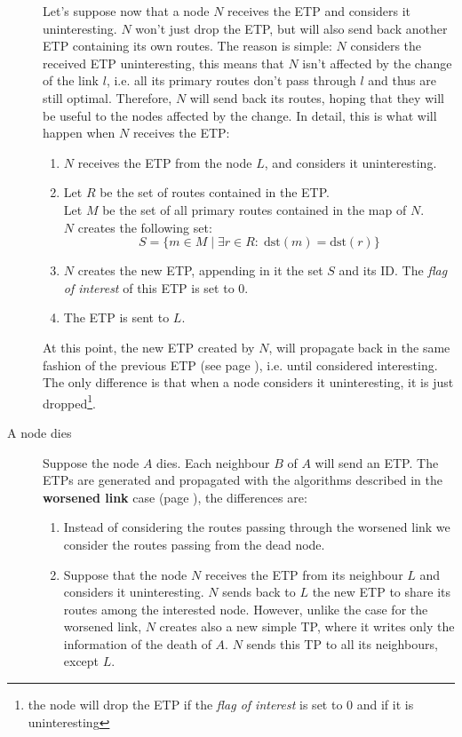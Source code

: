 \documentclass[a4paper]{article}
\newcommand{\T}[1]{\textrm{#1}}
\begin{document}
\begin{description}
	Let's suppose now that a node $N$ receives the ETP and considers it
	uninteresting. $N$ won't just drop the ETP, but will also send back
	another ETP containing its own routes. The reason is simple: $N$
	considers the received ETP uninteresting, this means that $N$ isn't
	affected by the change of the link $l$, i.e. all its primary routes don't
	pass through $l$ and thus are still optimal. Therefore, $N$ will
	send back its routes, hoping that they will be useful to the nodes
	affected by the change. In detail, this is what will happen when $N$
	receives the ETP:
	\begin{enumerate}
		\item $N$ receives the ETP from the node $L$, and considers it
			uninteresting.
		\item Let $R$ be the set of routes contained in the ETP.\\
		Let $M$ be the set of all primary routes contained in the map
		of $N$.\\
		$N$ creates the following set:
		\[
		S=\{m\in M\;|\; \exists r\in R:\;\T{dst}(m)=\T{dst}(r)\}
		\]
		\item $N$ creates the new ETP, appending in it the set $S$ and
			its ID. The \emph{flag of interest} of this ETP is set
			to 0.
		\item The ETP is sent to $L$.
	\end{enumerate}
	At this point, the new ETP created by $N$, will propagate back in the
	same fashion of the previous ETP (see page \pageref{ETPrule1}), i.e.
	until considered interesting. The only difference is that when a node
	considers it uninteresting, it is just dropped\footnote{the node will
	drop the ETP if the \emph{flag of interest} is set to 0 and if it is
	uninteresting}.
	\item[A node dies]
		Suppose the node $A$ dies. Each neighbour $B$ of $A$ will send
		an ETP. The ETPs are generated and propagated with the
		algorithms described in the \textbf{worsened link} case (page
		\pageref{wlink}), the differences are:
		\begin{enumerate}
			\item Instead of considering the routes passing
				through the worsened link we consider the
				routes passing from the dead node.
			\item Suppose that the node $N$ receives the ETP from
				its neighbour $L$ and considers it uninteresting.
				$N$ sends back to $L$ the new ETP to share its
				routes
				among the interested node. However, unlike the
				case for the worsened link, $N$ creates also a
				new simple TP, where it writes only the
				information of the death of $A$.
				$N$ sends this TP to all its neighbours, except $L$.


\end{enumerate}
\end{description}
\end{document}
